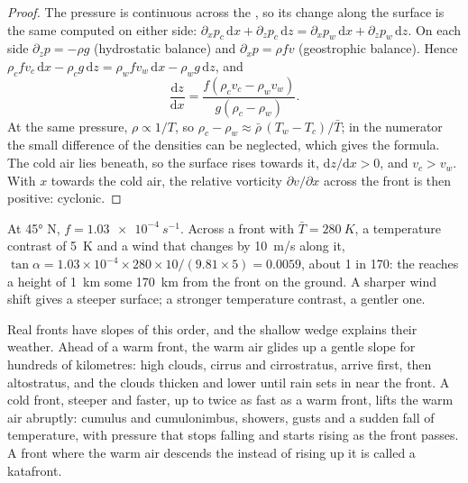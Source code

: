 \begin{proof}
The pressure is continuous across the , so its change along the surface is the
same computed on either side: $\partial_x p_c\,\mathrm{d}x + \partial_z p_c\,\mathrm{d}z =
\partial_x p_w\,\mathrm{d}x + \partial_z p_w\,\mathrm{d}z$. On each side $\partial_z p = -\rho g$
(hydrostatic balance) and $\partial_x p = \rho f v$ (geostrophic balance). Hence
$\rho_c f v_c\,\mathrm{d}x - \rho_c g\,\mathrm{d}z = \rho_w f v_w\,\mathrm{d}x - \rho_w
g\,\mathrm{d}z$, and
\[
  \frac{\mathrm{d}z}{\mathrm{d}x} = \frac{f(\rho_c v_c - \rho_w v_w)}{g(\rho_c - \rho_w)} .
\]
At the same pressure, $\rho \propto 1/T$, so $\rho_c - \rho_w \approx \bar\rho\,(T_w -
T_c)/\bar T$; in the numerator the small difference of the densities can be neglected, which
gives the formula. The cold air lies beneath, so the surface rises towards it, $\mathrm{d}z/
\mathrm{d}x > 0$, and $v_c > v_w$. With $x$ towards the cold air, the relative vorticity
$\partial v/\partial x$ across the front is then positive: cyclonic.
\end{proof}

\begin{example}\label{ex:b2:weather-systems:slope}
At \ang{45} N, $f = \qty{1.03e-4}{s^{-1}}$. Across a front with $\bar T = \qty{280}{K}$, a
temperature contrast of \qty{5}{K} and a wind that changes by \qty{10}{m/s} along it, $\tan\alpha
= 1.03 \times 10^{-4} \times 280 \times 10/(9.81 \times 5) = 0.0059$, about 1 in 170: the
 reaches a height of \qty{1}{km} some \qty{170}{km} from the front on the ground.
A sharper wind shift gives a steeper surface; a stronger temperature contrast, a gentler one.
\end{example}

Real fronts have slopes of this order, and the shallow wedge explains their weather. Ahead of a
warm front, the warm air glides up a gentle slope for hundreds of kilometres: high clouds,
cirrus and cirrostratus, arrive first, then altostratus, and the clouds thicken and lower until
rain sets in near the front. A cold front, steeper and faster, up to twice as fast as a warm
front, lifts the warm air abruptly: cumulus and cumulonimbus, showers, gusts and a sudden fall
of temperature, with pressure that stops falling and starts rising as the front passes. A front
where the warm air descends the  instead of rising up it is called a katafront.


